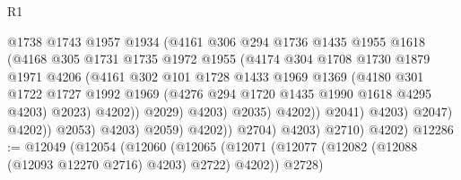 \begin{lexlean}{R1}
\begin{coremodule}
                                      @1738
                                      @1743
                                      @1957
                                      @1934
                                      (@4161
                                        @306
                                        @294
                                        @1736
                                        @1435
                                        @1955
                                        @1618
                                        (@4168
                                          @305
                                          @1731
                                          @1735
                                          @1972
                                          @1955
                                          (@4174
                                            @304
                                            @1708
                                            @1730
                                            @1879
                                            @1971
                                            @4206
                                            (@4161
                                              @302
                                              @101
                                              @1728
                                              @1433
                                              @1969
                                              @1369
                                              (@4180
                                                @301
                                                @1722
                                                @1727
                                                @1992
                                                @1969
                                                (@4276 @294 @1720 @1435 @1990 @1618 @4295 @4203)
                                                @2023)
                                              @4202))
                                          @2029)
                                        @4203)
                                      @2035)
                                    @4202))
                                @2041)
                              @4203)
                            @2047)
                          @4202))
                      @2053)
                    @4203)
                  @2059)
                @4202))
            @2704)
          @4203)
        @2710)
      @4202)
@12286 := @12049
    (@12054
      (@12060
        (@12065 (@12071 (@12077 (@12082 (@12088 (@12093 @12270 @2716) @4203) @2722) @4202)) @2728)

\end{coremodule}
\end{lexlean}
